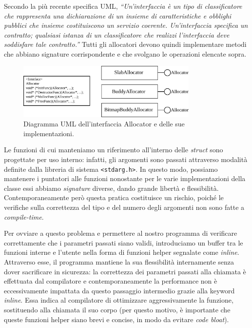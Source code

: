 Secondo la più recente specifica UML, \textit{“Un'interfaccia è un tipo di classificatore che rappresenta una dichiarazione di un insieme di caratteristiche e obblighi pubblici che insieme costituiscono un servizio coerente. Un'interfaccia specifica un contratto; qualsiasi istanza di un classificatore che realizzi l'interfaccia deve soddisfare tale contratto.”} Tutti gli allocatori devono quindi implementare metodi che abbiano signature corrispondente e che svolgano le operazioni elencate sopra.

\begin{figure}[H]
    \centering
    \includegraphics[width=0.8\textwidth]{images/allocator_interface_uml.pdf}
    \caption{Diagramma UML dell'interfaccia Allocator e delle sue implementazioni.}
    \label{fig:uml_allocator_interface}
\end{figure}

Le funzioni di cui manteniamo un riferimento all'interno delle \textit{struct} sono progettate per uso interno: infatti, gli argomenti sono passati attraverso modalità definite dalla libreria di sistema \texttt{<stdarg.h>}. In questo modo, possiamo mantenere i puntatori alle funzioni nonostante per le varie implementazioni della classe essi abbiamo \textit{signature} diverse, dando grande libertà e flessibilità. Contemporaneamente però questa pratica costituisce un rischio, poiché le verifiche sulla correttezza del tipo e del numero degli argomenti non sono fatte a \textit{compile-time}.

Per ovviare a questo problema e permettere al nostro programma di verificare correttamente che i parametri passati siano validi, introduciamo un buffer tra le funzioni interne e l’utente nella forma di funzioni helper segnalate come \textit{inline}. Attraverso esse, il programma mantiene la sua flessibilità internamente senza dover sacrificare in sicurezza: la correttezza dei parametri passati alla chiamata è effettuata dal compilatore e contemporaneamente la performance non è eccessivamente impattata da questo passaggio intermedio grazie alla keyword \textit{inline}. Essa indica al compilatore di ottimizzare aggressivamente la funzione, sostituendo alla chiamata il suo corpo (per questo motivo, è importante che queste funzioni helper siano brevi e concise, in modo da evitare \textit{code bloat}).

